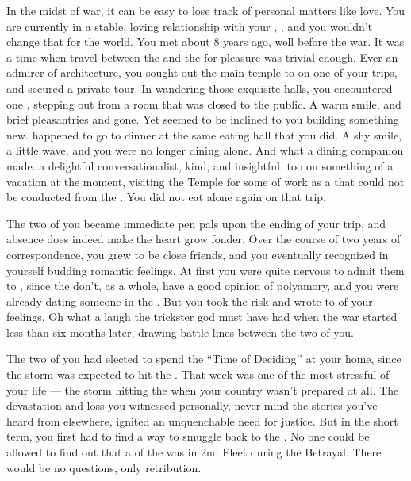 \documentclass[char]{GL2020}
\begin{document}
In the midst of war, it can be easy to lose track of personal matters like love. You are currently in a stable, loving relationship with your \cBeetle{\partner}, \cBeetle{\full}, and you wouldn't change that for the world. You met about 8 years ago, well before the war. It was a time when travel between the \pTech{} and the \pShip{} for pleasure was trivial enough. Ever an admirer of architecture, you sought out the main temple to \cTechGod{} on one of your trips, and secured a private tour. In wandering those exquisite halls, you encountered one \cBeetle{}, stepping out from a room that was closed to the public. A warm smile, and brief pleasantries and \cBeetle{\theywere} gone. Yet \cFlow{} seemed to be inclined to you building something new. \cBeetle{} happened to go to dinner at the same eating hall that you did. A shy smile, a little wave, and you were no longer dining alone. And what a dining companion \cBeetle{} made. \cBeetle{\Theyare} a delightful conversationalist, kind, and insightful. \cBeetle{\They} too \cBeetle{\were} on something of a vacation at the moment, visiting the Temple for some of \cBeetle{\their} work as a \cBeetle{\cleric} that could not be conducted from the \pSchool{}. You did not eat alone again on that trip.

The two of you became immediate pen pals upon the ending of your trip, and absence does indeed make the heart grow fonder. Over the course of two years of correspondence, you grew to be close friends, and you eventually recognized in yourself budding romantic feelings. At first you were quite nervous to admit them to \cBeetle{}, since the \pTech{} don’t, as a whole, have a good opinion of polyamory, and you were already dating someone in the \pShip{}. But you took the risk and wrote to \cBeetle{\them} of your feelings. Oh what a laugh the trickster god must have had when the war started less than six months later, drawing battle lines between the two of you. 

The two of you had elected to spend the ``Time of Deciding’’ at your home, since the storm was expected to hit the \pTech{}. That week was one of the most stressful of your life — the storm hitting the \pShip{} when your country wasn’t prepared at all. The devastation and loss you witnessed personally, never mind the stories you’ve heard from elsewhere, ignited an unquenchable need for justice. But in the short term, you first had to find a way to smuggle \cBeetle{} back to the \pSchool{}. No one could be allowed to find out that a \cBeetle{\cleric} of the \pTech{} was in 2nd Fleet during the Betrayal. There would be no questions, only retribution.
\end{document}
